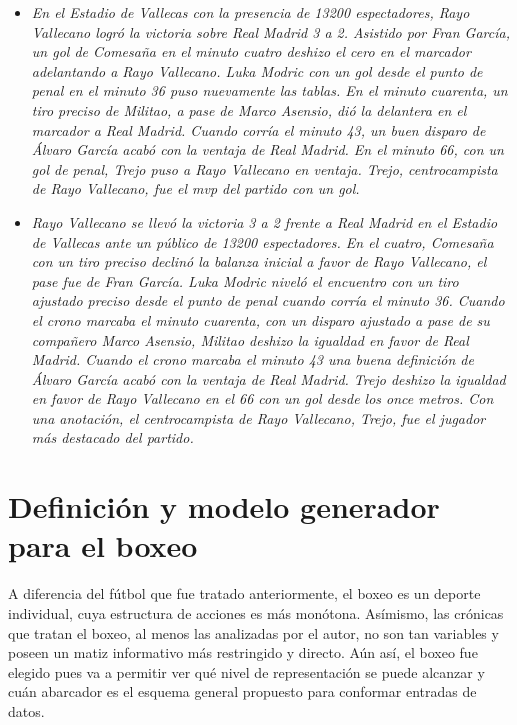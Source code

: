 \begin{itemize}
    \item \textit{En el Estadio de Vallecas con la presencia de 13200 espectadores, Rayo Vallecano logró la victoria sobre Real Madrid 3 a 2.
    Asistido por Fran García, un gol de Comesaña en el minuto cuatro deshizo el cero en el marcador adelantando a Rayo Vallecano. Luka Modric con un gol desde el punto de penal en el minuto 36 puso nuevamente las tablas. En el minuto cuarenta, un tiro preciso de Militao, a pase de Marco Asensio, dió la delantera en el marcador a Real Madrid. Cuando corría el minuto 43, un buen disparo de Álvaro García acabó con la ventaja de Real Madrid. En el minuto 66, con un gol de penal, Trejo puso a Rayo Vallecano en ventaja.
    Trejo, centrocampista de Rayo Vallecano, fue el mvp del partido con un gol.}
    \item \textit{Rayo Vallecano se llevó la victoria 3 a 2 frente a Real Madrid en el Estadio de Vallecas ante un público de 13200 espectadores.
    En el cuatro, Comesaña con un tiro preciso declinó la balanza inicial a favor de Rayo Vallecano, el pase fue de Fran García. Luka Modric niveló el encuentro con un tiro ajustado preciso desde el punto de penal cuando corría el minuto 36. Cuando el crono marcaba el minuto cuarenta, con un disparo ajustado a pase de su compañero Marco Asensio, Militao deshizo la igualdad en favor de Real Madrid. Cuando el crono marcaba el minuto 43 una buena definición de Álvaro García acabó con la ventaja de Real Madrid. Trejo deshizo la igualdad en favor de Rayo Vallecano en el 66 con un gol desde los once metros.
    Con una anotación, el centrocampista de Rayo Vallecano, Trejo, fue el jugador más destacado del partido.}
\end{itemize}


\section{Definición y modelo generador para el boxeo}

    A diferencia del fútbol que fue tratado anteriormente, el boxeo es un deporte individual, cuya estructura de acciones es más monótona. Asímismo, 
las crónicas que tratan el boxeo, al menos las analizadas por el autor, no son tan variables y poseen un matiz informativo más restringido y directo. 
Aún así, el boxeo fue elegido pues va a permitir ver qué nivel de representación se puede alcanzar y cuán abarcador es el esquema general 
propuesto para conformar entradas de datos.

